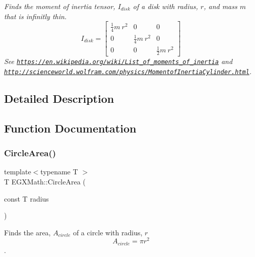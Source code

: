 \begin{DoxyCompactItemize}
\begin{DoxyCompactList}\small\item\em Finds the moment of inertia tensor, $I_{disk}$ of a disk with radius, $r$, and mass $m$ that is infinitly thin. \[ I_{disk}=\begin{bmatrix} \frac{1}{4}m\ r^2 & 0 & 0\\ 0 & \frac{1}{4}m\ r^2 & 0\\ 0 & 0 & \frac{1}{2}m\ r^2 \end{bmatrix} \] See \href{https://en.wikipedia.org/wiki/List_of_moments_of_inertia}{\tt https\+://en.\+wikipedia.\+org/wiki/\+List\+\_\+of\+\_\+moments\+\_\+of\+\_\+inertia} and \href{http://scienceworld.wolfram.com/physics/MomentofInertiaCylinder.html}{\tt http\+://scienceworld.\+wolfram.\+com/physics/\+Momentof\+Inertia\+Cylinder.\+html}. \end{DoxyCompactList}\end{DoxyCompactItemize}


\subsection{Detailed Description}


\subsection{Function Documentation}
\mbox{\label{group___e_g_x_math-_geometry-2_d-_circle_gabf5aadec991cc2bbf9d74fd83c46f40d}} 
\subsubsection{\texorpdfstring{Circle\+Area()}{CircleArea()}}
{\footnotesize\ttfamily template$<$typename T $>$ \\
T E\+G\+X\+Math\+::\+Circle\+Area (\begin{DoxyParamCaption}\item[{const T}]{radius }\end{DoxyParamCaption})}



Finds the area, $A_{circle}$ of a circle with radius, $r$ \[ A_{circle}=\pi r^2 \]. 


